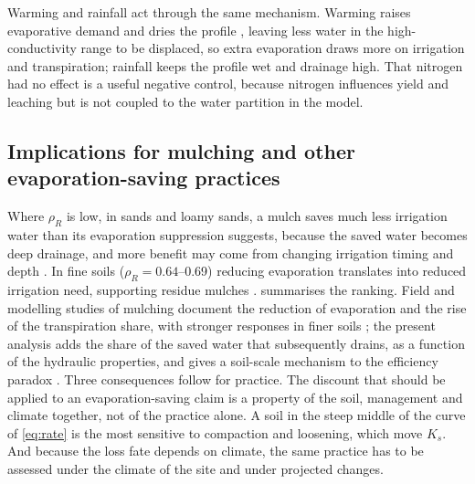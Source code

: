 \documentclass[review,12pt,authoryear]{elsarticle}
\begin{document}
Warming and rainfall act through the same mechanism. Warming raises evaporative demand and dries the profile \citep{Or2013,Shokri2011,Lehmann2008}, leaving less water in the high-conductivity range to be displaced, so extra evaporation draws more on irrigation and transpiration; rainfall keeps the profile wet and drainage high. That nitrogen had no effect is a useful negative control, because nitrogen influences yield and leaching but is not coupled to the water partition in the model.

\subsection{Implications for mulching and other evaporation-saving practices}
Where $\rho_R$ is low, in sands and loamy sands, a mulch saves much less irrigation water than its evaporation suppression suggests, because the saved water becomes deep drainage, and more benefit may come from changing irrigation timing and depth \citep{Fereres2007,Playan2006}. In fine soils ($\rho_R=0.64$--0.69) reducing evaporation translates into reduced irrigation need, supporting residue mulches \citep{BalwinderSingh2011,Vuaille2024}.  summarises the ranking. Field and modelling studies of mulching document the reduction of evaporation and the rise of the transpiration share, with stronger responses in finer soils \citep{Zheng2021,Kang2024}; the present analysis adds the share of the saved water that subsequently drains, as a function of the hydraulic properties, and gives a soil-scale mechanism to the efficiency paradox \citep{Ward2008,Grafton2018,Perry2017}. Three consequences follow for practice. The discount that should be applied to an evaporation-saving claim is a property of the soil, management and climate together, not of the practice alone. A soil in the steep middle of the curve of \cref{eq:rate} is the most sensitive to compaction and loosening, which move $K_s$. And because the loss fate depends on climate, the same practice has to be assessed under the climate of the site and under projected changes.

\end{document}
